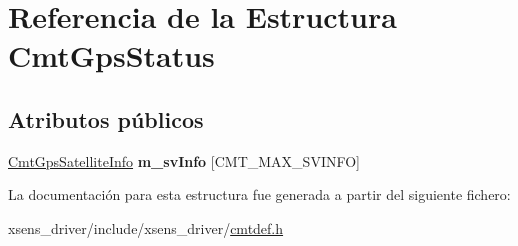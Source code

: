 \hypertarget{structCmtGpsStatus}{\section{\-Referencia de la \-Estructura \-Cmt\-Gps\-Status}
\label{structCmtGpsStatus}
}
\subsection*{\-Atributos públicos}
\begin{DoxyCompactItemize}
\item 
\hypertarget{structCmtGpsStatus_abed89024502124c8f65014f9101d1eb9}{\hyperlink{structCmtGpsSatelliteInfo}{\-Cmt\-Gps\-Satellite\-Info} {\bfseries m\-\_\-sv\-Info} \mbox{[}\-C\-M\-T\-\_\-\-M\-A\-X\-\_\-\-S\-V\-I\-N\-F\-O\mbox{]}}\label{structCmtGpsStatus_abed89024502124c8f65014f9101d1eb9}

\end{DoxyCompactItemize}


\-La documentación para esta estructura fue generada a partir del siguiente fichero\-:\begin{DoxyCompactItemize}
\item 
xsens\-\_\-driver/include/xsens\-\_\-driver/\hyperlink{cmtdef_8h}{cmtdef.\-h}\end{DoxyCompactItemize}

